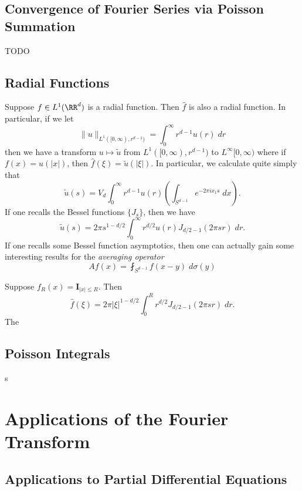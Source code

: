 \section{Convergence of Fourier Series via Poisson Summation}

TODO

\section{Radial Functions}

Suppose $f \in L^1(\RR^d)$ is a radial function. Then $\widehat{f}$ is also a radial function. In particular, if we let
%
\[ \| u \|_{L^1([0,\infty), r^{d-1})} = \int_0^\infty r^{d-1} u(r)\; dr \]
%
then we have a transform $u \mapsto \tilde{u}$ from $L^1([0,\infty), r^{d-1})$ to $L^\infty[0,\infty)$ where if $f(x) = u(|x|)$, then $\widehat{f}(\xi) = \tilde{u}(|\xi|)$. In particular, we calculate quite simply that
%
\[ \tilde{u}(s) = V_d \int_0^\infty r^{d-1} u(r) \left( \int_{S^{d-1}} e^{-2 \pi i x_1 s}\; dx \right). \]
%
If one recalls the Bessel functions $\{ J_s \}$, then we have
%
\[ \tilde{u}(s) = 2\pi s^{1 - d/2} \int_0^\infty r^{d/2} u(r) J_{d/2-1}(2 \pi s r)\; dr. \]
%
If one recalls some Bessel function asymptotics, then one can actually gain some interesting results for the \emph{averaging operator}
%
\[ Af(x) = \fint_{S^{d-1}} f(x-y)\; d\sigma(y) \]
%

\begin{example}
    Suppose $f_R(x) = \mathbf{I}_{|x| \leq R}$. Then
    \[ \widehat{f}(\xi) = 2 \pi |\xi|^{1-d/2} \int_0^R r^{d/2} J_{d/2-1}(2 \pi s r)\; dr. \]
    The 
\end{example}





\section{Poisson Integrals}

s



\chapter{Applications of the Fourier Transform}

\section{Applications to Partial Differential Equations}


